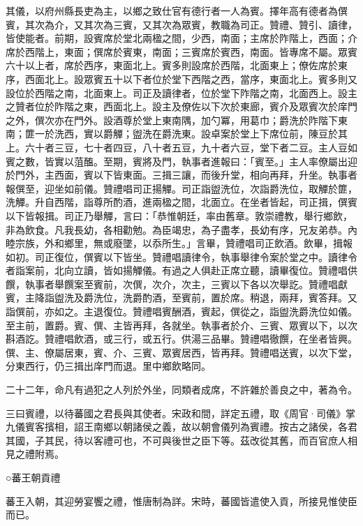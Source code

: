 其儀，以府州縣長吏為主，以鄉之致仕官有德行者一人為賓。擇年高有德者為僎賓，其次為介，又其次為三賓，又其次為眾賓，教職為司正。贊禮、贊引、讀律，皆使能者。前期，設賓席於堂北兩楹之間，少西，南面；主席於阼階上，西面；介席於西階上，東面；僎席於賓東，南面；三賓席於賓西，南面。皆專席不屬。眾賓六十以上者，席於西序，東面北上。賓多則設席於西階，北面東上；僚佐席於東序，西面北上。設眾賓五十以下者位於堂下西階之西，當序，東面北上。賓多則又設位於西階之南，北面東上。司正及讀律者，位於堂下阼階之南，北面西上。設主之贊者位於阼階之東，西面北上。設主及僚佐以下次於東廊，賓介及眾賓次於庠門之外，僎次亦在門外。設酒尊於堂上東南隅，加勺冪，用葛巾；爵洗於阼階下東南；篚一於洗西，實以爵觶；盥洗在爵洗東。設卓案於堂上下席位前，陳豆於其上。六十者三豆，七十者四豆，八十者五豆，九十者六豆，堂下者二豆。主人豆如賓之數，皆實以菹醢。至期，賓將及門，執事者進報曰：「賓至。」主人率僚屬出迎於門外，主西面，賓以下皆東面。三揖三讓，而後升堂，相向再拜，升坐。執事者報僎至，迎坐如前儀。贊禮唱司正揚觶。司正詣盥洗位，次詣爵洗位，取觶於篚，洗觶。升自西階，詣尊所酌酒，進兩楹之間，北面立。在坐者皆起，司正揖，僎賓以下皆報揖。司正乃舉觶，言曰：「恭惟朝廷，率由舊章。敦崇禮教，舉行鄉飲，非為飲食。凡我長幼，各相勸勉。為臣竭忠，為子盡孝，長幼有序，兄友弟恭。內睦宗族，外和鄉里，無或廢墜，以忝所生。」言畢，贊禮唱司正飲酒。飲畢，揖報如初。司正復位，僎賓以下皆坐。贊禮唱讀律令，執事舉律令案於堂之中。讀律令者詣案前，北向立讀，皆如揚觶儀。有過之人俱赴正席立聽，讀畢復位。贊禮唱供饌，執事者舉饌案至賓前，次僎，次介，次主，三賓以下各以次舉訖。贊禮唱獻賓，主降詣盥洗及爵洗位，洗爵酌酒，至賓前，置於席。稍退，兩拜，賓答拜。又詣僎前，亦如之。主退復位。贊禮唱賓酬酒，賓起，僎從之，詣盥洗爵洗位如儀。至主前，置爵。賓、僎、主皆再拜，各就坐。執事者於介、三賓、眾賓以下，以次斟酒訖。贊禮唱飲酒，或三行，或五行。供湯三品畢。贊禮唱徹饌，在坐者皆興。僎、主、僚屬居東，賓、介、三賓、眾賓居西，皆再拜。贊禮唱送賓，以次下堂，分東西行，仍三揖出庠門而退。里中鄉飲略同。

二十二年，命凡有過犯之人列於外坐，同類者成席，不許雜於善良之中，著為令。

三曰賓禮，以待蕃國之君長與其使者。宋政和間，詳定五禮，取《周官·司儀》掌九儀賓客擯相，詔王南鄉以朝諸侯之義，故以朝會儀列為賓禮。按古之諸侯，各君其國，子其民，待以客禮可也，不可與後世之臣下等。茲改從其舊，而百官庶人相見之禮附焉。

○蕃王朝貢禮

蕃王入朝，其迎勞宴饗之禮，惟唐制為詳。宋時，蕃國皆遣使入貢，所接見惟使臣而已。

